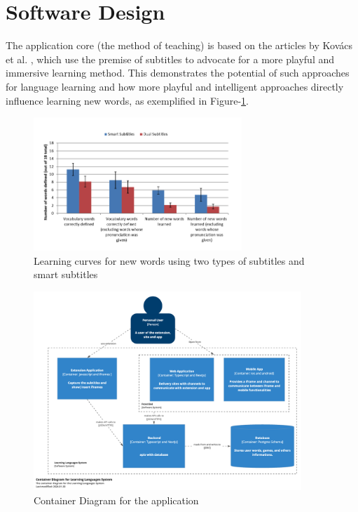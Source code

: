 \documentclass[12pt]{article}
\begin{document}
\section{Software Design}
The application core (the method of teaching) is based on the articles by Kovács et al. \cite{Kovacs14}, which use the premise of subtitles to advocate for a more playful and immersive learning method. This demonstrates the potential of such approaches for language learning and how more playful and intelligent approaches directly influence learning new words, as exemplified in Figure-\ref{fig:my_label}. 
\begin{figure}[!h]
\centering
\caption{Learning curves for new words using two types of subtitles and smart subtitles}
\label{fig:my_label}
\includegraphics[width=0.7\textwidth]{assets/3.png}
\end{figure} 
\begin{figure}[!h]
  \centering
  \caption{
    Container Diagram for the application
  }
  \label{fig:container_diagram}
  \includegraphics[width=0.9\textwidth]{assets/24.png}
\end{figure}
\end{document}
